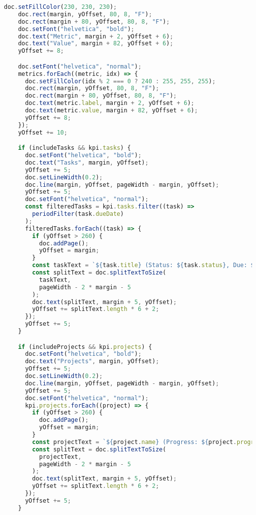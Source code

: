 \begin{lstlisting}[language=Typescript, caption=Тайлан автоматаар гаргах, frame=single]
    doc.setFillColor(230, 230, 230);
    doc.rect(margin, yOffset, 80, 8, "F");
    doc.rect(margin + 80, yOffset, 80, 8, "F");
    doc.setFont("helvetica", "bold");
    doc.text("Metric", margin + 2, yOffset + 6);
    doc.text("Value", margin + 82, yOffset + 6);
    yOffset += 8;

    doc.setFont("helvetica", "normal");
    metrics.forEach((metric, idx) => {
      doc.setFillColor(idx % 2 === 0 ? 240 : 255, 255, 255);
      doc.rect(margin, yOffset, 80, 8, "F");
      doc.rect(margin + 80, yOffset, 80, 8, "F");
      doc.text(metric.label, margin + 2, yOffset + 6);
      doc.text(metric.value, margin + 82, yOffset + 6);
      yOffset += 8;
    });
    yOffset += 10;

    if (includeTasks && kpi.tasks) {
      doc.setFont("helvetica", "bold");
      doc.text("Tasks", margin, yOffset);
      yOffset += 5;
      doc.setLineWidth(0.2);
      doc.line(margin, yOffset, pageWidth - margin, yOffset);
      yOffset += 5;
      doc.setFont("helvetica", "normal");
      const filteredTasks = kpi.tasks.filter((task) =>
        periodFilter(task.dueDate)
      );
      filteredTasks.forEach((task) => {
        if (yOffset > 260) {
          doc.addPage();
          yOffset = margin;
        }
        const taskText = `${task.title} (Status: ${task.status}, Due: ${task.dueDate})`;
        const splitText = doc.splitTextToSize(
          taskText,
          pageWidth - 2 * margin - 5
        );
        doc.text(splitText, margin + 5, yOffset);
        yOffset += splitText.length * 6 + 2;
      });
      yOffset += 5;
    }

    if (includeProjects && kpi.projects) {
      doc.setFont("helvetica", "bold");
      doc.text("Projects", margin, yOffset);
      yOffset += 5;
      doc.setLineWidth(0.2);
      doc.line(margin, yOffset, pageWidth - margin, yOffset);
      yOffset += 5;
      doc.setFont("helvetica", "normal");
      kpi.projects.forEach((project) => {
        if (yOffset > 260) {
          doc.addPage();
          yOffset = margin;
        }
        const projectText = `${project.name} (Progress: ${project.progress}%)`;
        const splitText = doc.splitTextToSize(
          projectText,
          pageWidth - 2 * margin - 5
        );
        doc.text(splitText, margin + 5, yOffset);
        yOffset += splitText.length * 6 + 2;
      });
      yOffset += 5;
    }


\end{lstlisting}
